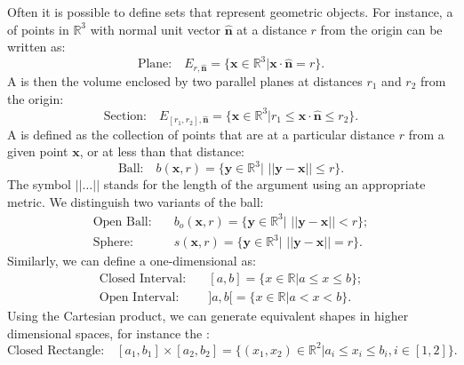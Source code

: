 Often it is possible to define sets that represent geometric objects.  For instance, a  of points in $\mathbb{R}^3$ with normal unit vector $\hat{\mathbf{n}}$ at a distance $r$ from the origin can be written as:
\begin{equation}
	\text{Plane:} \quad E_{r,\hat{\mathbf{n}}} = \{\mathbf{x}\in\mathbb{R}^3\vert\mathbf{x}\cdot\hat{\mathbf{n}} = r \}.
\end{equation}
A  is then the volume enclosed by two parallel planes at distances $r_1$ and $r_2$ from the origin:
\begin{equation}
	\text{Section:} \quad E_{[r_1,r_2],\hat{\mathbf{n}}} = \{\mathbf{x}\in\mathbb{R}^3\vert r_1\le\mathbf{x}\cdot\hat{\mathbf{n}}\le r_2 \}.
\end{equation}
A  is defined as the collection of points that are at a particular distance $r$ from a given point $\mathbf{x}$, or at less than that distance:
\begin{equation}
	\text{Ball:} \quad b(\mathbf{x},r) = \{\mathbf{y}\in\mathbb{R}^3\vert\,\, \vert\vert \mathbf{y}-\mathbf{x}\vert\vert \le r\}.
\end{equation}
The symbol $\vert\vert\ldots\vert\vert$ stands for the length of the argument using an appropriate metric.  We distinguish two variants of the ball:
\begin{align}
	\text{Open Ball:} &\quad b_o(\mathbf{x},r) = \{\mathbf{y}\in\mathbb{R}^3\vert\,\, \vert\vert \mathbf{y}-\mathbf{x}\vert\vert < r\};\\
	\text{Sphere:} &\quad s(\mathbf{x},r) = \{\mathbf{y}\in\mathbb{R}^3\vert\,\, \vert\vert \mathbf{y}-\mathbf{x}\vert\vert = r\}.
\end{align}
Similarly, we can define a one-dimensional  as:
\begin{align}
	\text{Closed Interval:} &\quad [a,b] = \{x\in\mathbb{R}\vert a\le x\le b\};\\
	\text{Open Interval:} &\quad ]a,b[ = \{x\in\mathbb{R}\vert a< x< b\}.
\end{align}
Using the Cartesian product, we can generate equivalent shapes in higher dimensional spaces, for instance the :
\begin{equation}
	\text{Closed Rectangle:} \quad [a_1,b_1]\times [a_2,b_2] = \{(x_1,x_2)\in\mathbb{R}^2\vert a_i\le x_i\le b_i, i\in[1,2]\}.
\end{equation}

